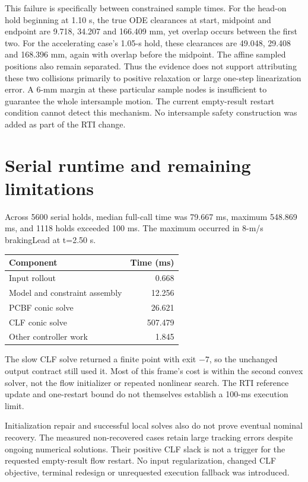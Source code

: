 \documentclass[10pt]{article}
\begin{document}
This failure is specifically between constrained sample times. For the head-on hold beginning at 1.10 s, the true ODE clearances at start, midpoint and endpoint are 9.718, 34.207 and 166.409 mm, yet overlap occurs between the first two. For the accelerating case's 1.05-s hold, these clearances are 49.048, 29.408 and 168.396 mm, again with overlap before the midpoint. The affine sampled positions also remain separated. Thus the evidence does not support attributing these two collisions primarily to positive relaxation or large one-step linearization error. A 6-mm margin at these particular sample nodes is insufficient to guarantee the whole intersample motion. The current empty-result restart condition cannot detect this mechanism. No intersample safety construction was added as part of the RTI change.

\section{Serial runtime and remaining limitations}
Across 5600 serial holds, median full-call time was 79.667 ms, maximum 548.869 ms, and 1118 holds exceeded 100 ms. The maximum occurred in 8-m/s brakingLead at t=2.50 s.
\begin{center}\begin{tabular}{lr}\toprule Component & Time (ms) \\\midrule
Input rollout & 0.668 \\
Model and constraint assembly & 12.256 \\
PCBF conic solve & 26.621 \\
CLF conic solve & 507.479 \\
Other controller work & 1.845 \\
\bottomrule\end{tabular}\end{center}
The slow CLF solve returned a finite point with exit $-7$, so the unchanged output contract still used it. Most of this frame's cost is within the second convex solver, not the flow initializer or repeated nonlinear search. The RTI reference update and one-restart bound do not themselves establish a 100-ms execution limit.

Initialization repair and successful local solves also do not prove eventual nominal recovery. The measured non-recovered cases retain large tracking errors despite ongoing numerical solutions. Their positive CLF slack is not a trigger for the requested empty-result flow restart. No input regularization, changed CLF objective, terminal redesign or unrequested execution fallback was introduced.
\end{document}
